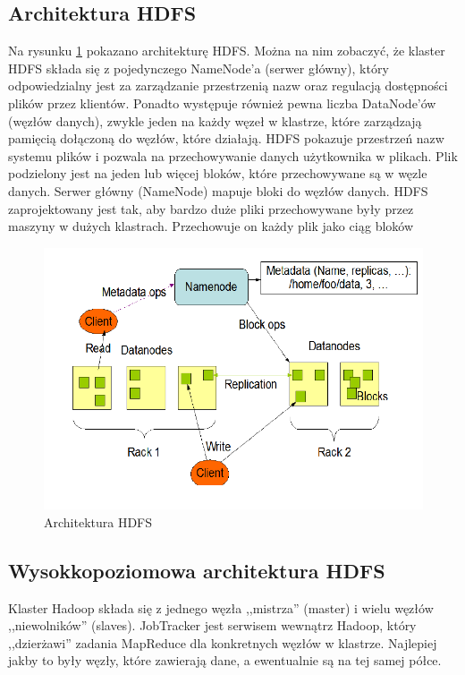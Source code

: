 \documentclass[twocolumn]{svjour3}          %
\begin{document}
\subsection{Architektura HDFS}
\label{ssub:hdfs_architecture}
Na rysunku \ref{fig:hdfs_architecture} pokazano architekturę HDFS. Można na nim zobaczyć, że klaster HDFS składa się z pojedynczego NameNode'a (serwer główny), który odpowiedzialny jest za zarządzanie przestrzenią nazw oraz regulacją dostępności plików przez klientów. Ponadto występuje również pewna liczba DataNode'ów (węzłów danych), zwykle jeden na każdy węzeł w klastrze, które zarządzają pamięcią dołączoną do węzłów, które działają. HDFS pokazuje przestrzeń nazw systemu plików i pozwala na przechowywanie danych użytkownika w plikach. Plik podzielony jest na jeden lub więcej bloków, które przechowywane są w węzle danych. Serwer główny (NameNode) mapuje bloki do węzłów danych.
HDFS zaprojektowany jest tak, aby bardzo duże pliki przechowywane były przez maszyny w dużych klastrach. Przechowuje on  każdy plik jako ciąg bloków


\begin{figure}
    \centerline{\includegraphics[scale=0.4]{obrazki/HDFS_architecture.png}}
    \caption{Architektura HDFS}
    \label{fig:hdfs_architecture}       %
\end{figure}

\subsection{Wysokkopoziomowa architektura HDFS}
\label{ssub:hdfs_high_level_architecture}
Klaster Hadoop składa się z jednego węzła ,,mistrza'' (master) i wielu węzłów ,,niewolników'' (slaves). JobTracker jest serwisem wewnątrz Hadoop, który ,,dzierżawi'' zadania MapReduce dla konkretnych węzłów w klastrze. Najlepiej jakby to były węzły, które zawierają dane, a ewentualnie są na tej samej półce.
\end{document}
